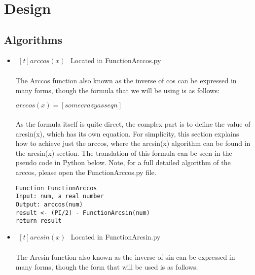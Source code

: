 \section{Design}
    \subsection{Algorithms}
        \begin{itemize}
            \item $\begin{aligned}[t]
                arccos(x)
            \end{aligned}$
                Located in FunctionArccos.py
                \paragraph{}
                The Arccos function also known as the inverse of cos can be expressed in many forms, though the formula that we will be using is as follows:

                \begin{center}
                    $arccos(x) = [some crazyass eqn]$
                \end{center}

                \paragraph{}
                As the formula itself is quite direct, the complex part is to define the value of arcsin(x), which has its own equation. For simplicity, this section explains how to achieve just the arccos, where the arcsin(x) algorithm can be found in the arcsin(x) section. The translation of this formula can be seen in the pseudo code in Python below. Note, for a full detailed algorithm of the arccos, please open the FunctionArccos.py file.

                \begin{lstlisting}
Function FunctionArccos
Input: num, a real number
Output: arccos(num)
result <- (PI/2) - FunctionArcsin(num)
return result
                \end{lstlisting}

        \item $\begin{aligned}[t]
            arcsin(x)
        \end{aligned}$
            Located in FunctionArcsin.py

            \paragraph{}
            The Arcsin function also known as the inverse of sin can be expressed in many forms, though the form that will be used is as follows:


\end{itemize}
